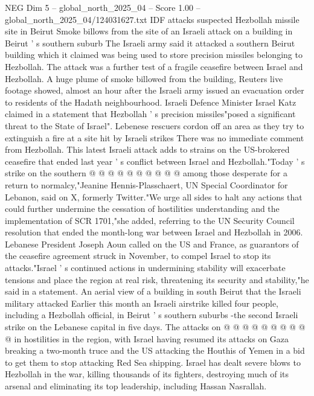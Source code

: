 \begin{textsample}{NEG Dim 5 – global\_north\_2025\_04 – Score 1.00 – global\_north\_2025\_04/124031627.txt}  \label{ex:f5_neg_348}
IDF attacks suspected Hezbollah missile site in Beirut Smoke billows from the site of an Israeli attack on a building in Beirut ' s southern suburb The Israeli army said it attacked a southern Beirut building which it claimed was being used to store precision missiles belonging to Hezbollah.
The attack was a further test of a fragile ceasefire between Israel and Hezbollah.
A huge plume of smoke billowed from the building, Reuters live footage showed, almost an hour after the Israeli army issued an evacuation order to residents of the Hadath neighbourhood.
Israeli Defence Minister Israel Katz claimed in a statement that Hezbollah ' s precision missiles"posed a significant threat to the State of Israel".
Lebenese rescuers cordon off an area as they try to extinguish a fire at a site hit by Israeli strikes There was no immediate comment from Hezbollah.
This latest Israeli attack adds to strains on the US-brokered ceasefire that ended last year ' s conflict between Israel and Hezbollah."Today ' s strike on the southern @ @ @ @ @ @ @ @ @ @ among those desperate for a return to normalcy,"Jeanine Hennis-Plasschaert, UN Special Coordinator for Lebanon, said on X, formerly Twitter."We urge all sides to halt any actions that could further undermine the cessation of hostilities understanding and the implementation of SCR 1701,"she added, referring to the UN Security Council resolution that ended the month-long war between Israel and Hezbollah in 2006.
Lebanese President Joseph Aoun called on the US and France, as guarantors of the ceasefire agreement struck in November, to compel Israel to stop its attacks."Israel ' s continued actions in undermining stability will exacerbate tensions and place the region at real risk, threatening its security and stability,"he said in a statement.
An aerial view of a building in south Beirut that the Israeli military attacked Earlier this month an Israeli airstrike killed four people, including a Hezbollah official, in Beirut ' s southern suburbs -the second Israeli strike on the Lebanese capital in five days.
The attacks on @ @ @ @ @ @ @ @ @ @ in hostilities in the region, with Israel having resumed its attacks on Gaza breaking a two-month truce and the US attacking the Houthis of Yemen in a bid to get them to stop attacking Red Sea shipping.
Israel has dealt severe blows to Hezbollah in the war, killing thousands of its fighters, destroying much of its arsenal and eliminating its top leadership, including Hassan Nasrallah.

\end{textsample}
